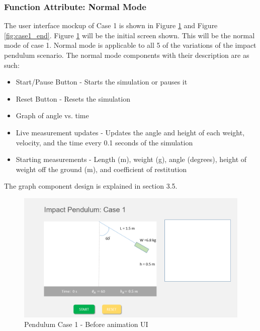 \subsubsection{Function Attribute: Normal Mode}
The user interface mockup of Case 1 is shown in Figure \ref{fig:case1_start} and Figure \ref{fig:case1_end}. Figure \ref{fig:case1_start} will be the initial screen shown. This will be the normal mode of case 1. Normal mode is applicable to all 5 of the variations of the impact pendulum scenario. 
The normal mode components with their description are as such:
\begin{itemize}
    \item Start/Pause Button - Starts the simulation or pauses it 
    \item Reset Button - Resets the simulation
    \item Graph of angle vs. time 
    \item Live measurement updates  - Updates the angle and height of each weight, velocity, and the time every 0.1 seconds of the simulation
    \item Starting measurements  - Length (m), weight (g), angle (degrees), height of weight off the ground (m), and coefficient of restitution 
\end{itemize}

The graph component design is explained in section 3.5. \newline


\begin{figure}[H]
  \includegraphics[width=5.5 in]{pendulum_case_1_1.png}
  \caption{Pendulum Case 1 - Before animation UI}
  \label{fig:case1_start}
\end{figure}
 
